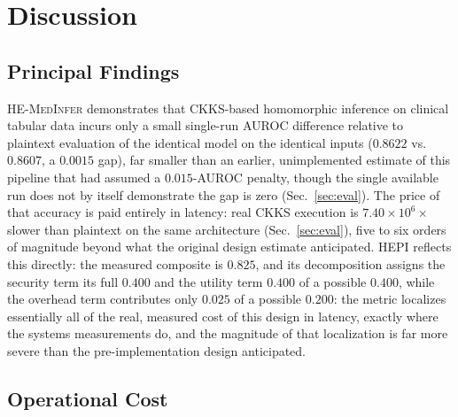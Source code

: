 \documentclass[journal,compsoc]{IEEEtran}
\newcommand{\HEPI}{\textsc{HEPI}}          %
\newcommand{\framework}{\textsc{HE-MedInfer}}
\begin{document}
\section{Discussion}
\label{sec:discussion}

\subsection{Principal Findings}

\framework{} demonstrates that CKKS-based homomorphic inference on clinical
tabular data incurs only a small single-run AUROC difference relative to
plaintext evaluation of the identical model on the identical inputs
($0.8622$ vs.\ $0.8607$, a $0.0015$ gap), far smaller than an earlier,
unimplemented estimate of this pipeline
that had assumed a $0.015$-AUROC penalty, though the single available run
does not by itself demonstrate the gap is zero (Sec.~\ref{sec:eval}). The price of that accuracy is paid
entirely in latency: real CKKS execution is $7.40 \times 10^6\times$ slower
than plaintext on the same architecture (Sec.~\ref{sec:eval}), five to six orders of
magnitude beyond what the original design estimate anticipated. \HEPI{}
reflects this directly: the measured composite is $0.825$, and its
decomposition assigns the security term its full $0.400$ and the utility term
$0.400$ of a possible $0.400$, while the overhead term contributes only
$0.025$ of a possible $0.200$: the metric localizes essentially all of the
real, measured cost of this design in latency, exactly where the systems
measurements do, and the magnitude of that localization is far more severe
than the pre-implementation design anticipated.

\subsection{Operational Cost}
\end{document}
